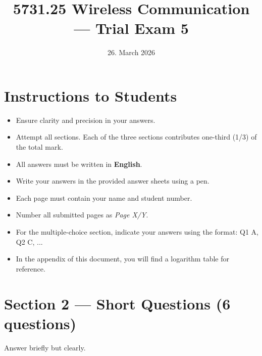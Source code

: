 \documentclass[11pt,a4paper]{article}
\begin{document}
\pagestyle{fancy}
\fancyhf{}
\renewcommand{\headrulewidth}{0pt}
\renewcommand{\footrulewidth}{0pt}
\fancyfoot[R]{\thepage/\pageref{LastPage}}
\fancypagestyle{plain}{
    \fancyhf{}
    \fancyfoot[R]{\thepage/\pageref{LastPage}}
    \renewcommand{\headrulewidth}{0pt}
    \renewcommand{\footrulewidth}{0pt}
}

\title{5731.25 Wireless Communication --- Trial Exam 5}
\date{26. March 2026}
\maketitle

\section*{Instructions to Students}
\begin{itemize}
    \item Ensure clarity and precision in your answers.
    \item Attempt all sections. Each of the three sections contributes one-third (1/3) of the total mark.
    \item All answers must be written in \textbf{English}.
    \item Write your answers in the provided answer sheets using a pen.
    \item Each page must contain your name and student number.
    \item Number all submitted pages as \textit{Page X/Y}.
    \item For the multiple-choice section, indicate your answers using the format: Q1 A, Q2 C, ...
    \item In the appendix of this document, you will find a logarithm table for reference.
\end{itemize}

\newpage

\newpage

\section*{Section 2 --- Short Questions (6 questions)}
Answer briefly but clearly.
\end{document}
